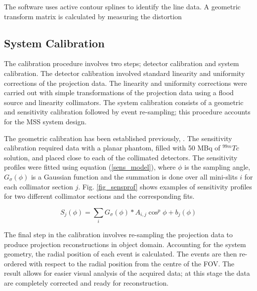 The software uses active contour splines to identify the line data. A geometric transform matrix is calculated by measuring the distortion 




\subsection{System Calibration}
 The calibration procedure involves two steps; detector calibration and system calibration. The detector calibration involved standard linearity and uniformity corrections of the projection data. The linearity and uniformity corrections were carried out with simple transformations of the projection data using a flood source and linearity collimators. The system calibration consists of a geometric and sensitivity calibration followed by event re-sampling; this procedure accounts for the MSS system design. 
 
The geometric calibration has been established previously, \cite{8340862}. The sensitivity calibration required data with a planar phantom, filled with 50 MBq of $^{99m}Tc$ solution, and placed close to each of the collimated detectors. The sensitivity profiles were fitted using equation (\ref{sens_model}), where $\phi$ is the sampling angle, $G_{\sigma}(\phi)$ is a Gaussian function and the summation is done over all mini-slits $i$ for each collimator section $j$. Fig. \ref{fig_sensprof} shows examples of sensitivity profiles for two different collimator sections and the corresponding fits.

\begin{equation}
\label{sens_model}
S_{j}(\phi) = \sum_{i} G_{\sigma}(\phi) \ast A_{i,j} \cos^{p}{\phi} + b_{j}(\phi)
\end{equation}

The final step in the calibration involves re-sampling the projection data to produce projection reconstructions in object domain. Accounting for the system geometry, the radial position of each event is calculated. The events are then re-ordered with respect to the radial position from the centre of the FOV. The result allows for easier visual analysis of the acquired data; at this stage the data are completely corrected and ready for reconstruction. 

